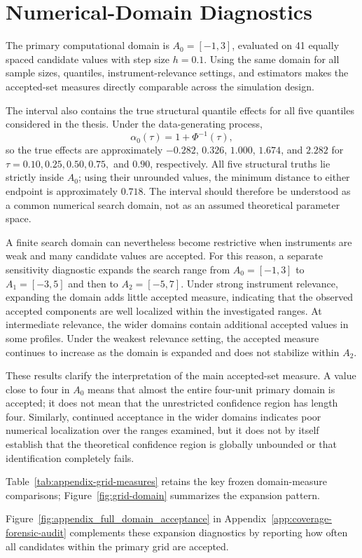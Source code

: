 \section{Numerical-Domain Diagnostics}
\label{app:numerical-domain-diagnostics}

\label{app:domain-choice}

The primary computational domain is \(A_0=[-1,3]\), evaluated on 41 equally spaced candidate values with step size \(h=0.1\). 
Using the same domain for all sample sizes, quantiles, instrument-relevance settings, and estimators makes the accepted-set measures directly comparable across the simulation design.

The interval also contains the true structural quantile effects for all five quantiles considered in the thesis. Under the data-generating process,
\[
\alpha_0(\tau)=1+\Phi^{-1}(\tau),
\]
so the true effects are approximately \(-0.282\), \(0.326\), \(1.000\), \(1.674\), and \(2.282\) for \(\tau=0.10,0.25,0.50,0.75,\) and \(0.90\), respectively. All five structural truths lie strictly inside \(A_0\); using their unrounded values, the minimum distance to either endpoint is approximately \(0.718\). The interval should therefore be understood as a common numerical search domain, not as an assumed theoretical parameter space.

A finite search domain can nevertheless become restrictive when instruments are weak and many candidate values are accepted. For this reason, a separate sensitivity diagnostic expands the search range from \(A_0=[-1,3]\) to \(A_1=[-3,5]\) and then to \(A_2=[-5,7]\). Under strong instrument relevance, expanding the domain adds little accepted measure, indicating that the observed accepted components are well localized within the investigated ranges. At intermediate relevance, the wider domains contain additional accepted values in some profiles. Under the weakest relevance setting, the accepted measure continues to increase as the domain is expanded and does not stabilize within \(A_2\).

These results clarify the interpretation of the main accepted-set measure. A value close to four in \(A_0\) means that almost the entire four-unit primary domain is accepted; it does not mean that the unrestricted confidence region has length four. Similarly, continued acceptance in the wider domains indicates poor numerical localization over the ranges examined, but it does not by itself establish that the theoretical confidence region is globally unbounded or that identification completely fails.

Table~\ref{tab:appendix-grid-measures} retains the key frozen domain-measure comparisons; Figure~\ref{fig:grid-domain} summarizes the expansion pattern.



\FloatBarrier

Figure~\ref{fig:appendix_full_domain_acceptance} in Appendix~\ref{app:coverage-forensic-audit} complements these expansion diagnostics by reporting how often all candidates within the primary grid are accepted.
\Needspace{7\baselinedist}
